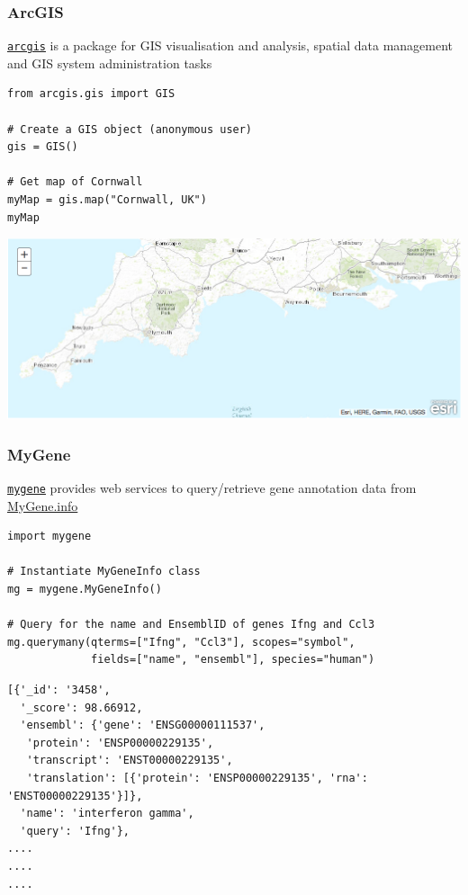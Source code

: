 \documentclass[pdf]{beamer}
\begin{document}
\begin{frame}[fragile]
\frametitle{ArcGIS}

\href{https://developers.arcgis.com/python/}{\texttt{arcgis}} is a package 
for GIS visualisation and analysis, spatial data management and GIS system
administration tasks

\vspace{0.2cm}

\begin{lstlisting}[style=python]
from arcgis.gis import GIS

# Create a GIS object (anonymous user)
gis = GIS()

# Get map of Cornwall
myMap = gis.map("Cornwall, UK")
myMap
\end{lstlisting}

\vspace{-0.5cm}

\centering
\includegraphics[width=.7\textwidth]{arcgis.png}

\end{frame}

\begin{frame}[fragile]
\frametitle{MyGene}

\href{http://docs.mygene.info/projects/mygene-py/en/latest/}{\texttt{mygene}} provides 
web services to query/retrieve gene annotation data from \href{http://mygene.info/}{MyGene.info}

\vspace{0.2cm}

\begin{lstlisting}[style=python]
import mygene

# Instantiate MyGeneInfo class
mg = mygene.MyGeneInfo() 

# Query for the name and EnsemblID of genes Ifng and Ccl3
mg.querymany(qterms=["Ifng", "Ccl3"], scopes="symbol", 
             fields=["name", "ensembl"], species="human") 
\end{lstlisting}

\vspace{-0.8cm}
{\fontsize{8}{8}\selectfont
\begin{verbatim}
[{'_id': '3458',
  '_score': 98.66912,
  'ensembl': {'gene': 'ENSG00000111537',
   'protein': 'ENSP00000229135',
   'transcript': 'ENST00000229135',
   'translation': [{'protein': 'ENSP00000229135', 'rna': 'ENST00000229135'}]},
  'name': 'interferon gamma',
  'query': 'Ifng'},
....
....
....
\end{verbatim}}

\end{frame}
\end{document}

